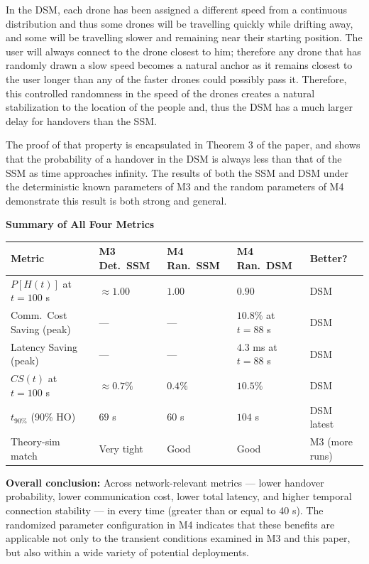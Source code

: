 \documentclass[11pt]{article}
\newcommand{\subquestion}[1]{
    \vspace{0.3cm}
    \noindent\textbf{#1}
    \vspace{0.1cm}
}
\begin{document}
\begin{enumerate}[label=\textbf{Scribe Question \arabic*:}, leftmargin=*, itemsep=1.5em]
In the DSM, each drone has been assigned a different speed from a continuous distribution and thus
some drones will be travelling quickly while drifting away, and some will be travelling slower and
remaining near their starting position. The user will always connect to the drone closest to him;
therefore any drone that has randomly drawn a slow speed becomes a natural anchor as it remains
closest to the user longer than any of the faster drones could possibly pass it. Therefore, this
controlled randomness in the speed of the drones creates a natural stabilization to the location of
the people and, thus the DSM has a much larger delay for handovers than the SSM.

The proof of that property is encapsulated in Theorem 3 of the paper, and shows that the probability
of a handover in the DSM is always less than that of the SSM as time approaches infinity. The results
of both the SSM and DSM under the deterministic known parameters of M3 and the random
parameters of M4 demonstrate this result is both strong and general.

\subquestion{Summary of All Four Metrics}

\vspace{0.3cm}
\begin{center}
\begin{tabular}{lllll}
    \toprule
    \textbf{Metric} & \textbf{M3 Det.\ SSM} & \textbf{M4 Ran.\ SSM} & \textbf{M4 Ran.\ DSM} & \textbf{Better?} \\
    \midrule
    $P[H(t)]$ at $t=100$ s        & $\approx 1.00$ & $1.00$  & $0.90$           & DSM \\
    Comm.\ Cost Saving (peak)      & ---            & ---     & $10.8\%$ at $t=88$ s & DSM \\
    Latency Saving (peak)          & ---            & ---     & $4.3$ ms at $t=88$ s & DSM \\
    $CS(t)$ at $t=100$ s           & $\approx 0.7\%$ & $0.4\%$ & $10.5\%$        & DSM \\
    $t_{90\%}$ (90\% HO)           & $69$ s         & $60$ s  & $104$ s          & DSM latest \\
    Theory-sim match               & Very tight     & Good    & Good             & M3 (more runs) \\
    \bottomrule
\end{tabular}
\end{center}
\vspace{0.3cm}

\textbf{Overall conclusion:} Across network-relevant metrics --- lower handover probability, lower
communication cost, lower total latency, and higher temporal connection stability --- in every time
(greater than or equal to 40 s). The randomized parameter configuration in M4 indicates that these
benefits are applicable not only to the transient conditions examined in M3 and this paper, but also
within a wide variety of potential deployments.


\end{enumerate}
\end{document}
